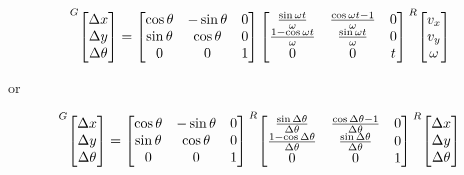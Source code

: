 \begin{theorem}
  \begin{equation}
    \prescript{G}{}{\begin{bmatrix}
      \Delta x \\
      \Delta y \\
      \Delta \theta
    \end{bmatrix}} =
    \begin{bmatrix}
      \cos\theta & -\sin\theta & 0 \\
      \sin\theta &  \cos\theta & 0 \\
               0 &           0 & 1
    \end{bmatrix}
    \begin{bmatrix}
      \frac{\sin\omega t}{\omega} & \frac{\cos\omega t - 1}{\omega} & 0 \\
      \frac{1 - \cos\omega t}{\omega} & \frac{\sin\omega t}{\omega} & 0 \\
      0 & 0 & t
    \end{bmatrix}
    \prescript{R}{}{\begin{bmatrix}
      v_x \\
      v_y \\
      \omega
    \end{bmatrix}}
    \label{eq:pose_exponential}
  \end{equation}

  or

  \begin{equation}
    \prescript{G}{}{\begin{bmatrix}
      \Delta x \\
      \Delta y \\
      \Delta \theta
    \end{bmatrix}} =
    \begin{bmatrix}
      \cos\theta & -\sin\theta & 0 \\
      \sin\theta &  \cos\theta & 0 \\
               0 &           0 & 1
    \end{bmatrix}
    \prescript{R}{}{\begin{bmatrix}
      \frac{\sin\Delta\theta}{\Delta\theta} &
        \frac{\cos\Delta\theta - 1}{\Delta\theta} & 0 \\
      \frac{1 - \cos\Delta\theta}{\Delta\theta} &
        \frac{\sin\Delta\theta}{\Delta\theta} & 0 \\
      0 & 0 & 1
    \end{bmatrix}}
    \prescript{R}{}{\begin{bmatrix}
      \Delta x \\
      \Delta y \\
      \Delta\theta
    \end{bmatrix}}
  \end{equation}


\end{theorem}
